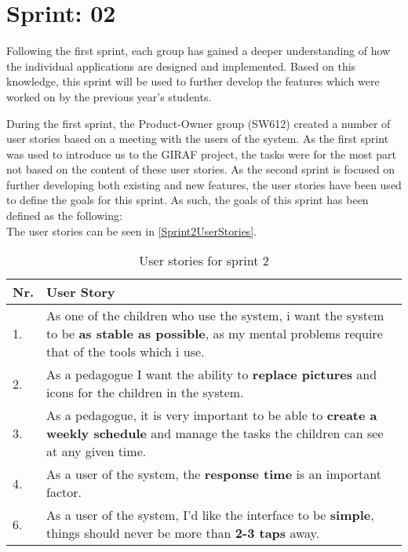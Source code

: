 \chapter{Sprint: 02}
Following the first sprint, each group has gained a deeper understanding of how
the individual applications are designed and implemented. Based on this
knowledge, this sprint will be used to further develop the features which were
worked on by the previous year's students.\nl

During the first sprint, the Product-Owner group (SW612) created a number of
user stories based on a meeting with the users of the system. As the first
sprint was used to introduce us to the GIRAF project, the tasks were for the
most part not based on the content of these user stories. As the second sprint
is focused on further developing both existing and new features, the user
stories have been used to define the goals for this sprint. As such, the goals
of this sprint has been defined as the following:\\
 The user stories can be seen in \autoref{Sprint2UserStories}.

\begin{table}[H]
\centering 
\begin{tabular}{|l|p{12.5cm}|}
\hline
Nr. & User Story \\\hline
1. & As one of the children who use the system, i want the system to be 
\textbf{as stable as possible}, as my mental problems require that of the tools
which i use. \\ \hline
2. & As a pedagogue I want the ability to \textbf{replace pictures} and icons
for the children in the system.\\ \hline
3. & As a pedagogue, it is very important to be able to \textbf{create a weekly
schedule} and manage the tasks the children can see at any given time.\\ \hline
4. & As a user of the system, the \textbf{response time} is an important
factor.\\ \hline
6. & As a user of the system, I'd like the interface to be \textbf{simple},
things should never be more than \textbf{2-3 taps} away. \\\hline
\end{tabular}
\caption{User stories for sprint 2}
\label{Sprint2UserStories}
\end{table}


